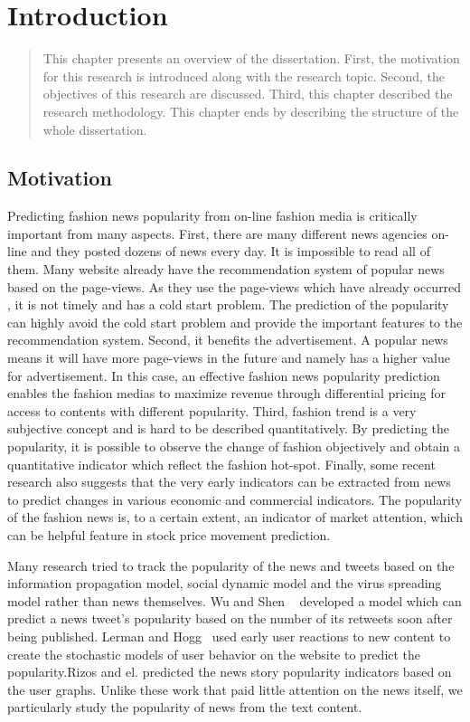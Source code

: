 \chapter{Introduction}
\label{introduction}

\begin{quote}
This chapter presents an overview of the dissertation. First, the motivation for this research is introduced along with the research topic. Second, the objectives of this research are discussed. Third, this chapter described the research methodology. This chapter ends by describing the structure of the whole dissertation.
\end{quote}

\section{Motivation}
Predicting fashion news popularity from on-line fashion media is critically important from many aspects. First, there are many different news agencies on-line and they posted dozens of news every day. It is impossible to read all of them. Many website already have the recommendation system of popular news based on the page-views. As they use the page-views which have already occurred , it is not timely and has a cold start problem. The prediction of the popularity can highly avoid the cold start problem and provide the important features to the recommendation system. Second, it benefits the advertisement. A popular news means it will have more page-views in the future and namely has a higher value for advertisement. In this case, an effective fashion news popularity prediction enables the fashion medias to maximize revenue through differential pricing for access to contents with different popularity. Third, fashion trend is a very subjective concept and is hard to be described quantitatively. By predicting the popularity, it is possible to observe the change of fashion objectively and obtain a quantitative indicator which reflect the fashion hot-spot. Finally, some recent research also suggests that the very early indicators can be extracted from news to predict changes in various economic and commercial indicators. The popularity of the fashion news is, to a certain extent, an indicator of market attention, which can be helpful feature in stock price movement prediction.

Many research tried to track the popularity of the news and tweets based on the information propagation model, social dynamic model and the virus spreading model rather than news themselves. Wu and Shen ~\cite{wu2015analyzing} developed a model which can predict a news tweet’s popularity based on the number of its retweets soon after being published. Lerman and Hogg~\cite{lerman2010using} used early user reactions to new content to create the stochastic models of user behavior on the website to predict the popularity.Rizos and el.\cite{rizos2016predicting} predicted the news story popularity indicators based on the user graphs. Unlike these work that paid little attention on the news itself, we particularly study the popularity of news from the text content.

